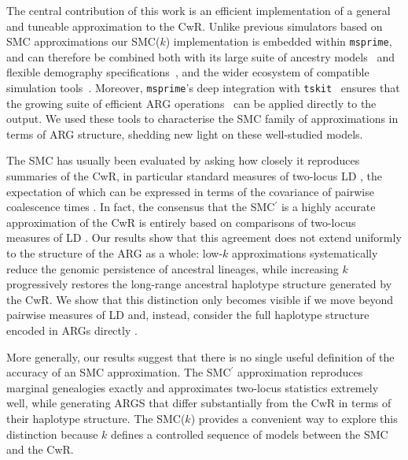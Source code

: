 \documentclass[9pt,twocolumn,twoside,lineno]{gsajnl}
\begin{document}
The central contribution of this work is an efficient implementation of a general and tuneable approximation to the CwR. Unlike previous simulators based on SMC approximations \citep{chen_fast_2009, staab_scrm_2015, shlyakhter_cosi2_2014} our SMC($k$) implementation is embedded within \texttt{msprime}, and can therefore be combined
both with its large suite of ancestry
models~\citep{baumdicker_efficient_2022} and flexible demography
specifications~\citep{gower2022demes},
and the wider ecosystem of compatible simulation
tools~\citep{haller2019slim,stdpopsim2020,stdpopsim2023,tsambos2023link,tagami2024tstrait}.
Moreover, \texttt{msprime}'s deep
integration with \texttt{tskit}~\citep{jeffery_population-scale_2026} ensures
that the growing suite of efficient ARG operations~\citep{fritze2026forest,lehmann2026on,lee2026genetic} can be applied directly to
the output.
We used these  tools to characterise the SMC family of
approximations in terms of ARG structure, shedding new light on these
well-studied models.

The SMC has usually been evaluated by asking how closely it reproduces summaries of the CwR, in particular standard measures of two-locus LD \citep{hill1968linkage}, the expectation of which can be expressed in terms of the covariance of pairwise coalescence times \citep{mcVean2002genealogical}. In fact, the consensus that the SMC$^\prime$ is a highly accurate approximation of the CwR is entirely based on comparisons of two-locus measures of LD \citep{paul2011accurate, mcVean2002genealogical, wilton_smc_2015}. Our results show that this agreement does not extend uniformly to the structure of the ARG as a whole: low-$k$ approximations systematically reduce the genomic persistence of ancestral lineages, while increasing $k$ progressively restores the long-range ancestral haplotype structure generated by the CwR. We show that this distinction only becomes visible if we move beyond pairwise measures of LD and, instead, consider the full haplotype structure encoded in ARGs directly \citep{wong_general_2024,fritze2026forest}.

More generally, our results suggest that there is no single useful definition of the accuracy of an SMC approximation. The SMC$^\prime$ approximation reproduces marginal genealogies exactly and approximates two-locus statistics extremely well, while generating ARGS that differ substantially from the CwR in terms of their haplotype structure. The SMC($k$) provides a convenient way to explore this distinction because $k$ defines a controlled sequence of models between the SMC and the CwR.
\end{document}

